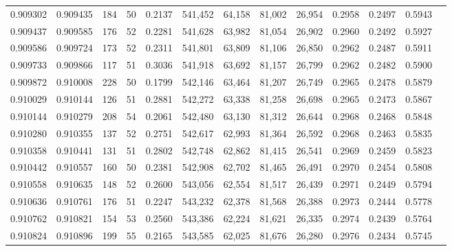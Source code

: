 \begin{tabular}{rrrrrrrrrrrrr}
0.909302 & 0.909435 &   184 &  50 &                                     0.2137 & 541,452 &  64,158 &  81,002 &  26,954 & 0.2958 & 0.2497 & 0.5943 \\
0.909437 & 0.909585 &   176 &  52 &                                     0.2281 & 541,628 &  63,982 &  81,054 &  26,902 & 0.2960 & 0.2492 & 0.5927 \\
0.909586 & 0.909724 &   173 &  52 &                                     0.2311 & 541,801 &  63,809 &  81,106 &  26,850 & 0.2962 & 0.2487 & 0.5911 \\
0.909733 & 0.909866 &   117 &  51 &                                     0.3036 & 541,918 &  63,692 &  81,157 &  26,799 & 0.2962 & 0.2482 & 0.5900 \\
0.909872 & 0.910008 &   228 &  50 &                                     0.1799 & 542,146 &  63,464 &  81,207 &  26,749 & 0.2965 & 0.2478 & 0.5879 \\
0.910029 & 0.910144 &   126 &  51 &                                     0.2881 & 542,272 &  63,338 &  81,258 &  26,698 & 0.2965 & 0.2473 & 0.5867 \\
0.910144 & 0.910279 &   208 &  54 &                                     0.2061 & 542,480 &  63,130 &  81,312 &  26,644 & 0.2968 & 0.2468 & 0.5848 \\
0.910280 & 0.910355 &   137 &  52 &                                     0.2751 & 542,617 &  62,993 &  81,364 &  26,592 & 0.2968 & 0.2463 & 0.5835 \\
0.910358 & 0.910441 &   131 &  51 &                                     0.2802 & 542,748 &  62,862 &  81,415 &  26,541 & 0.2969 & 0.2459 & 0.5823 \\
0.910442 & 0.910557 &   160 &  50 &                                     0.2381 & 542,908 &  62,702 &  81,465 &  26,491 & 0.2970 & 0.2454 & 0.5808 \\
0.910558 & 0.910635 &   148 &  52 &                                     0.2600 & 543,056 &  62,554 &  81,517 &  26,439 & 0.2971 & 0.2449 & 0.5794 \\
0.910636 & 0.910761 &   176 &  51 &                                     0.2247 & 543,232 &  62,378 &  81,568 &  26,388 & 0.2973 & 0.2444 & 0.5778 \\
0.910762 & 0.910821 &   154 &  53 &                                     0.2560 & 543,386 &  62,224 &  81,621 &  26,335 & 0.2974 & 0.2439 & 0.5764 \\
0.910824 & 0.910896 &   199 &  55 &                                     0.2165 & 543,585 &  62,025 &  81,676 &  26,280 & 0.2976 & 0.2434 & 0.5745 \\

\end{tabular}
